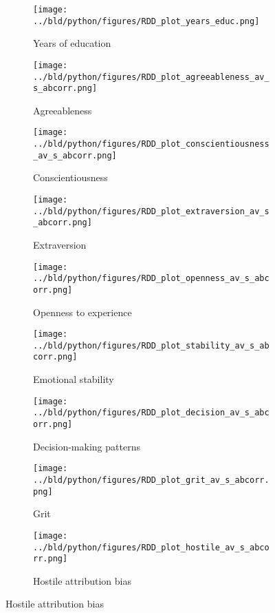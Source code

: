 \begin{figure}
	\centering
	\caption{The effect of increasing mandatory education}
	\label{fig:RD-style}
	\begin{subfigure}{0.45\linewidth}
		\texttt{[image: ../bld/python/figures/RDD\_plot\_years\_educ.png]}
		\caption{Years of education}
	\end{subfigure}

	\begin{subfigure}{0.45\linewidth}
		\texttt{[image: ../bld/python/figures/RDD\_plot\_agreeableness\_av\_s\_abcorr.png]}
		\caption{Agreeableness}
	\end{subfigure}\hfill
	\begin{subfigure}{0.45\linewidth}
		\texttt{[image: ../bld/python/figures/RDD\_plot\_conscientiousness\_av\_s\_abcorr.png]}
		\caption{Conscientiousness}
	\end{subfigure}

	\begin{subfigure}{0.45\linewidth}
		\texttt{[image: ../bld/python/figures/RDD\_plot\_extraversion\_av\_s\_abcorr.png]}
		\caption{Extraversion}
	\end{subfigure}\hfill
	\begin{subfigure}{0.45\linewidth}
		\texttt{[image: ../bld/python/figures/RDD\_plot\_openness\_av\_s\_abcorr.png]}
		\caption{Openness to experience}
	\end{subfigure}

	\begin{subfigure}{0.45\linewidth}
		\texttt{[image: ../bld/python/figures/RDD\_plot\_stability\_av\_s\_abcorr.png]}
		\caption{Emotional stability}
	\end{subfigure}\hfill
	\begin{subfigure}{0.45\linewidth}
		\texttt{[image: ../bld/python/figures/RDD\_plot\_decision\_av\_s\_abcorr.png]}
		\caption{Decision-making patterns}
	\end{subfigure}

	\begin{subfigure}{0.45\linewidth}
		\texttt{[image: ../bld/python/figures/RDD\_plot\_grit\_av\_s\_abcorr.png]}
		\caption{Grit}
	\end{subfigure}\hfill
	\begin{subfigure}{0.45\linewidth}
		\texttt{[image: ../bld/python/figures/RDD\_plot\_hostile\_av\_s\_abcorr.png]}
		\caption{Hostile attribution bias}
	\end{subfigure}


\end{figure}
